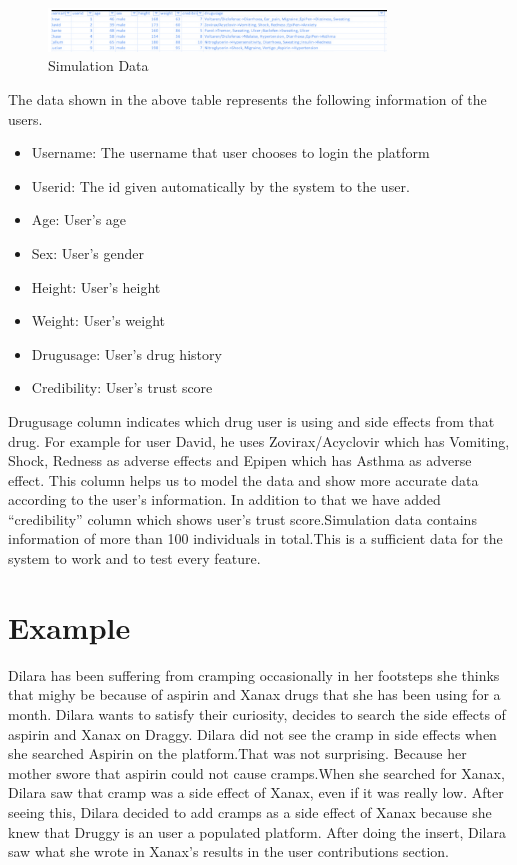 \documentclass[21pt,a4paper,notitlepage]{report}
\begin{document}
\begin{figure}
	\centering
	\includegraphics[width=0.8\textwidth]{data.png}
	\caption{Simulation Data}
	\label{fig:data}
\end{figure}

The data shown in the above table represents the following information of the users.
\begin{itemize}
	\item Username: The username that user chooses to login the platform
	\item Userid: The id given automatically by the system to the user.
	\item Age: User’s age
	\item Sex: User’s gender
	\item Height: User’s height
	\item Weight: User’s weight
	\item Drugusage: User’s drug history
	\item Credibility: User’s trust score
\end{itemize}

Drugusage column indicates which drug user is using and side effects from that drug. For example for user David, he uses Zovirax/Acyclovir which has Vomiting, Shock, Redness as adverse effects and Epipen which has Asthma as adverse effect. This column helps us to model the data and show more accurate data according to the user’s information. In addition to that we have added “credibility” column which shows user’s trust score.Simulation data contains information of more than 100 individuals in total.This is a sufficient data for the system to work and to test every feature.

\section{Example}
Dilara has been suffering from cramping occasionally in her footsteps she thinks that mighy be because of aspirin and Xanax drugs  that she has been using for a month. Dilara wants to satisfy their curiosity, decides to search the side effects of aspirin and Xanax on Draggy. Dilara did not see the cramp in side effects when she searched Aspirin on the platform.That was not surprising. Because her mother swore that aspirin could not cause cramps.When she searched for Xanax, Dilara saw that cramp was a side effect of Xanax, even if it was really low. After seeing this, Dilara decided to add cramps as a side effect of Xanax because she knew that Druggy is an user a populated platform. After doing the insert, Dilara saw what she wrote in Xanax’s results in the user contributions section.
\end{document}

